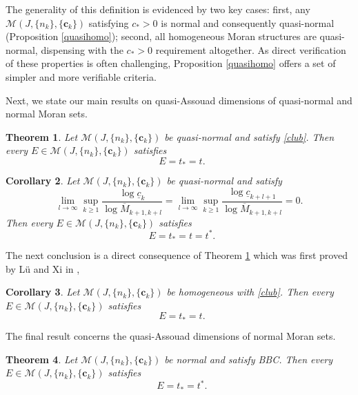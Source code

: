 \documentclass[12pt]{amsart}
\numberwithin{equation}{section}
\theoremstyle{plain}
\newtheorem{theorem}{Theorem}[section]
\newtheorem{corollary}[theorem]{Corollary}
\theoremstyle{remark}
\theoremstyle{definition}
\newcommand{\om}{\overline{M}}
\newcommand{\ccc}{\mathbf{c}}
\newcommand{\f}{\frac}
\newcommand{\uc}{\underline{c}}
\renewcommand{\ge}{\geqslant}
\DeclareMathOperator{\dimqa}{dim_{qA}}
\begin{document}
The generality of this definition is evidenced by two key cases: first, any $ \mathcal{M}(J,\{n_k\},\{\ccc_k\})$ satisfying $c_*>0$ is normal and consequently quasi-normal (Proposition \ref{quasihomo}); second, all homogeneous Moran structures are quasi-normal, dispensing with the $c_*>0$ requirement altogether.  As direct verification of these properties is often challenging, Proposition \ref{quasihomo} offers a set of simpler and more verifiable criteria.
	
	Next,  we state our main results on quasi-Assouad dimensions of quasi-normal and normal Moran sets.
	\begin{theorem}\label{main1}
		Let $\mathcal{M}(J,\{n_k\},\{\ccc_k\})$ be quasi-normal and satisfy \eqref{club}. Then every   $E\in\mathcal{M}(J,\{n_k\},\{\ccc_k\})$ satisfies
		\[
		\dimqa E=t_*=t.
		\]
	\end{theorem}
	
		\begin{corollary}\label{t_*=t^*}
		Let $\mathcal{M}(J,\{n_k\},\{\ccc_k\})$ be quasi-normal and satisfy
\begin{equation} \label{cdnllZ}
		\lim_{l\to \infty}\sup_{k\ge 1}\f{\log \uc_k}{\log \om_{k+1,k+l}}=\lim_{l\to \infty}\sup_{k\ge 1}\f{\log \uc_{k+l+1}}{\log \om_{k+1,k+l}}=0.
\end{equation}
		 Then every $E\in\mathcal{M}(J,\{n_k\},\{\ccc_k\})$ satisfies
		\begin{equation*}
			\dimqa E=t_*=t=t^*.
		\end{equation*}
	\end{corollary}
	
	
	
	The next  conclusion is a direct consequence of Theorem \ref{main1} which was first proved by   L\"{u} and Xi in \cite{lu2016quasi}, 
	
	\begin{corollary} 
		Let $\mathcal{M}(J,\{n_k\},\{\ccc_k\})$ be homogeneous with   \eqref{club}. Then every $E\in\mathcal{M}(J,\{n_k\},\{\ccc_k\})$ satisfies
		\begin{equation*}
			\dimqa E=t_*=t.
		\end{equation*}
	\end{corollary}
	
The final result concerns the quasi-Assouad dimensions of normal Moran sets.
	\begin{theorem}\label{main2}
		Let $\mathcal{M}(J,\{n_k\},\{\ccc_k\})$ be normal and satisfy BBC. Then every $E\in\mathcal{M}(J,\{n_k\},\{\ccc_k\})$ satisfies
		\[
		\dimqa E=t_*=t^*.
		\]
	\end{theorem}
\end{document}
